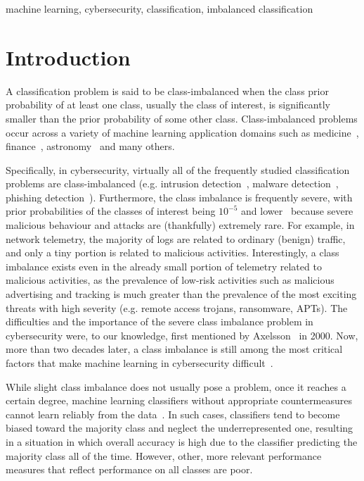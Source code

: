\documentclass[conference]{IEEEtran}
\begin{document}
\begin{IEEEkeywords}
    machine learning, cybersecurity, classification, imbalanced classification
\end{IEEEkeywords}


\section{Introduction}

A classification problem is said to be class-imbalanced when the class prior probability of at
least one class, usually the class of interest, is significantly smaller than the prior probability
of some other class. Class-imbalanced problems occur across a variety of machine learning
application domains such as medicine~\cite{medical-imb-data},
finance~\cite{fraud-detection-imb-data, bank-fraud-imb-data}, astronomy~\cite{astronomy-imb-data}
and many others.

Specifically, in cybersecurity, virtually all of the frequently studied classification problems are
class-imbalanced (e.g. intrusion detection~\cite{bayesian-forests}, malware
detection~\cite{malware-detection}, phishing detection~\cite{phishing-detection}). Furthermore, the
class imbalance is frequently severe, with prior probabilities of the classes of interest being
$10^{-5}$ and lower~\cite{bayesian-forests} because severe malicious behaviour and attacks are
(thankfully) extremely rare. For example, in network telemetry, the majority of logs are related to
ordinary (benign) traffic, and only a tiny portion is related to malicious activities.
Interestingly, a class imbalance exists even in the already small portion of telemetry related to
malicious activities, as the prevalence of low-risk activities such as malicious advertising and
tracking is much greater than the prevalence of the most exciting threats with high severity (e.g.
remote access trojans, ransomware, APTs). The difficulties and the importance of the severe class
imbalance problem in cybersecurity were, to our knowledge, first mentioned by
Axelsson~\cite{axelsson} in 2000. Now, more than two decades later, a class imbalance is still
among the most critical factors that make machine learning in cybersecurity
difficult~\cite{dos-donts-cybersec, malware-detection-is-hard}.

While slight class imbalance does not usually pose a problem, once it reaches a certain degree,
machine learning classifiers without appropriate countermeasures cannot learn reliably from the
data~\cite{learning-from-imb-data}. In such cases, classifiers tend to become biased toward the
majority class and neglect the underrepresented one, resulting in a situation in which overall
accuracy is high due to the classifier predicting the majority class all of the time. However,
other, more relevant performance measures that reflect performance on all classes are poor.
\end{document}
